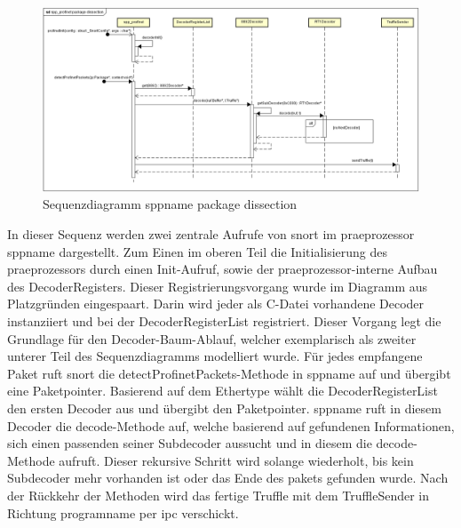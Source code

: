 \begin{figure}[H]
  \centering
  \includegraphics[width=\textwidth]{../diagramimages/spp-profinet-package-dissection.png}
  \caption[Sequenzdiagramm \gls{sppname} package dissection]{Sequenzdiagramm \gls{sppname} package dissection}
\end{figure}

In dieser Sequenz werden zwei zentrale Aufrufe von \gls{snort} im \gls{praeprozessor} \gls{sppname} dargestellt. Zum Einen im oberen Teil die Initialisierung des \gls{praeprozessor}s durch einen Init-Aufruf, sowie der \gls{praeprozessor}-interne Aufbau des DecoderRegisters. Dieser Registrierungsvorgang wurde im Diagramm aus Platzgründen eingespaart. Darin wird jeder als C-Datei vorhandene Decoder instanziiert und bei der DecoderRegisterList registriert. Dieser Vorgang legt die Grundlage für den Decoder-Baum-Ablauf, welcher exemplarisch als zweiter unterer Teil des Sequenzdiagramms modelliert wurde. Für jedes empfangene Paket ruft \gls{snort} die detectProfinetPackets-Methode in \gls{sppname} auf und übergibt eine Paketpointer. Basierend auf dem Ethertype wählt die DecoderRegisterList den ersten Decoder aus und übergibt den Paketpointer. \gls{sppname} ruft in diesem Decoder die decode-Methode auf, welche basierend auf gefundenen Informationen, sich einen passenden seiner Subdecoder aussucht und in diesem die decode-Methode aufruft. Dieser rekursive Schritt wird solange wiederholt, bis kein Subdecoder mehr vorhanden ist oder das Ende des \gls{paket}s gefunden wurde.
Nach der Rückkehr der Methoden wird das fertige Truffle mit dem TruffleSender in Richtung \gls{programname} per \gls{ipc} verschickt.